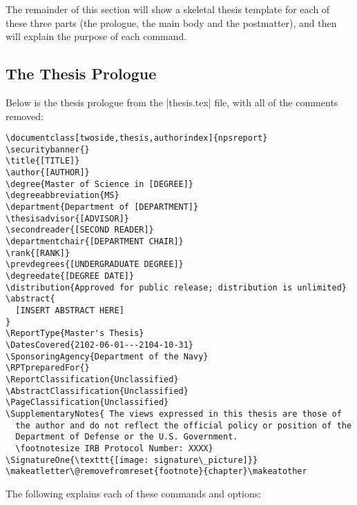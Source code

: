 The remainder of this section will show a skeletal thesis template for
each of these three parts (the prologue, the main body and the
postmatter), and then will explain the purpose of each command.

\subsection{The Thesis Prologue}\label{thesisprologue}
Below is the thesis prologue from the |thesis.tex| file, with all of
the comments removed:
\begin{Verbatim}[fontsize=\small]
\documentclass[twoside,thesis,authorindex]{npsreport} 
\securitybanner{}
\title{[TITLE]}
\author{[AUTHOR]}
\degree{Master of Science in [DEGREE]}
\degreeabbreviation{MS}
\department{Department of [DEPARTMENT]}
\thesisadvisor{[ADVISOR]}
\secondreader{[SECOND READER]}
\departmentchair{[DEPARTMENT CHAIR]}
\rank{[RANK]}
\prevdegrees{[UNDERGRADUATE DEGREE]}  
\degreedate{[DEGREE DATE]} 
\distribution{Approved for public release; distribution is unlimited}
\abstract{
  [INSERT ABSTRACT HERE]
}
\ReportType{Master's Thesis}
\DatesCovered{2102-06-01---2104-10-31}
\SponsoringAgency{Department of the Navy}
\RPTpreparedFor{}
\ReportClassification{Unclassified}
\AbstractClassification{Unclassified}
\PageClassification{Unclassified}
\SupplementaryNotes{ The views expressed in this thesis are those of
  the author and do not reflect the official policy or position of the
  Department of Defense or the U.S. Government.
  \footnotesize IRB Protocol Number: XXXX}
\SignatureOne{\texttt{[image: signature\_picture]}}
\makeatletter\@removefromreset{footnote}{chapter}\makeatother
\end{Verbatim}

The following explains each of these commands and options:

